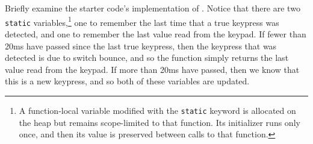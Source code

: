 Briefly examine the starter code's implementation of .
Notice that there are two \lstinline{static} variables,\footnote{
    A function-local variable modified with the \lstinline{static} keyword is allocated on the heap but remains scope-limited to that function.
    Its initializer runs only once, and then its value is preserved between calls to that function.}
one to remember the last time that a true keypress was detected, and one to remember the last value read from the keypad.
If fewer than 20ms have passed since the last true keypress, then the keypress that was detected is due to switch bounce, and so the function simply returns the last value read from the keypad.
If more than 20ms have passed, then we know that this is a new keypress, and so both of these variables are updated.